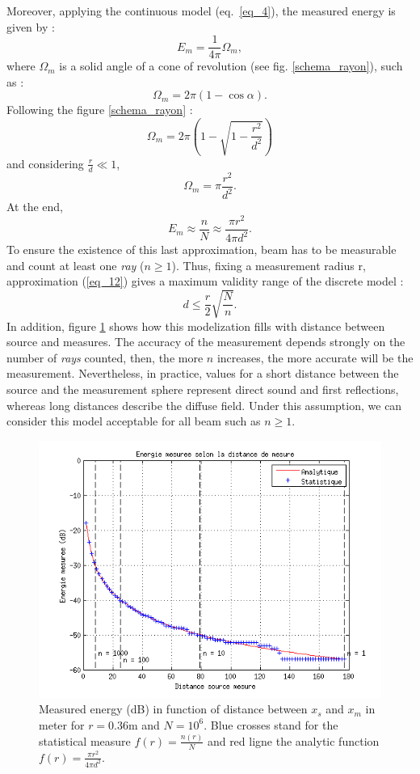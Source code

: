 \documentclass[AMA,STIX1COL]{WileyNJD-v2}
\begin{document}
Moreover, applying the continuous model (eq.~\ref{eq_4}), the measured energy is given by :
\begin{equation}
E_m = \frac{1}{4\pi}  \Omega_m,
\end{equation}
where $\Omega_m$ is a solid angle of a cone of revolution (see fig. \ref{schema_rayon}), such as :
\begin{equation}
\Omega_m = 2\pi(1-\cos{\alpha}).
\end{equation}
Following the figure \ref{schema_rayon} :
\begin{equation}
\Omega_m = 2\pi \left( 1 - \sqrt{1-\frac{r^2}{d^2}} \right)
\end{equation}
and considering $\frac{r}{d} \ll 1$, 
\begin{equation}
\Omega_m = \pi \frac{r^2}{d^2}.
\end{equation}
At the end, 
\begin{equation}
E_m \approx  \frac{n}{N} \approx  \frac{\pi r^2}{4\pi d^2}.
\label{eq_12}
\end{equation}
To ensure the existence of this last approximation, beam has to be measurable and count at least one \textit{ray} ($n\geq1$). Thus, fixing a measurement radius r, approximation (\ref{eq_12}) gives a maximum validity range of the discrete model :  
\begin{equation}
\label{eq_13}
	d \leq \frac{r}{2}\sqrt{\frac{N}{n}}.
\end{equation}
In addition, figure \ref{energie} shows how this modelization fills with distance between source and measures. The accuracy of the measurement depends strongly on the number of  \textit{rays} counted, then, the more $n$ increases, the more accurate will be the measurement. Nevertheless, in practice, values for a short distance between the source and the measurement sphere represent direct sound and first reflections, whereas long distances describe the diffuse field. Under this assumption, we can consider this model acceptable for all beam such as $n\geq1$. 

\begin{figure}[t]
\centering
	\includegraphics[width=0.65\linewidth]{energie.png}
	\caption{Measured energy (dB) in function of distance between $x_s$ and $x_m$ in meter for $r = 0.36$m and $N = 10^6$. Blue crosses stand for the statistical measure $f(r) = \frac{n(r)}{N}$ and red ligne the analytic function $f(r) = \frac{\pi r^2}{4\pi d^2}$.}
	\label{energie}
\end{figure}
\end{document}
